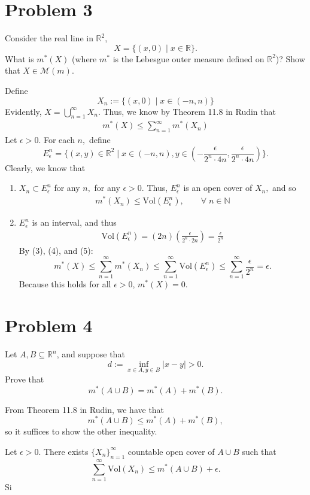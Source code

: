 \documentclass[11pt]{article}
\newcommand{\Vol}{\text{Vol}}
\newcommand{\bbN}{\mathbb{N}}
\newcommand{\bbR}{\mathbb{R}}
\begin{document}
\newpage
\section*{Problem 3}
\begin{problem}
    Consider the real line in $\mathbb{R}^2$, 
\[
X = \{(x,0) \mid x \in \mathbb{R}\}.
\]
What is $m^*(X)$ (where $m^*$ is the Lebesgue outer measure defined on $\mathbb{R}^2$)? Show that $X \in \mathcal{M}(m)$.
\end{problem}
\begin{solution}
Define 
\[X_n := \{(x,0) \mid x \in (-n, n)\}\]
Evidently, $X = \bigcup_{n=1}^\infty X_n.$ Thus, we know by Theorem 11.8 in Rudin that
\begin{align}
m^*(X) \leq \sum_{n=1}^\infty m^*(X_n)    
\end{align}
Let $\epsilon>0.$ For each $n,$ define 
\[E_\epsilon^n = \{(x,y) \in \bbR^2 \mid x \in (-n, n), y \in (-\frac{\epsilon}{2^n \cdot 4n}, \frac{\epsilon}{2^n \cdot 4n})\}.\] Clearly, we know that 
\begin{enumerate}
    \item $X_n \subset E_\epsilon^n$ for any $n,$ for any $\epsilon>0.$ Thus, $E_\epsilon^n$ is an open cover of $X_n,$ and so 
    \begin{align}
        m^*(X_n) \leq \Vol(E_\epsilon^n), \qquad \forall \;n \in \bbN
    \end{align}
    \item $E_\epsilon^n$ is an interval, and thus 
    \begin{align}\Vol(E_\epsilon^n) = (2n)(\frac{\epsilon}{2^n \cdot 2n}) = \frac{\epsilon}{2^n}    
    \end{align}
By (3), (4), and (5):
\[m^*(X) \leq \sum_{n=1}^\infty m^*(X_n)\leq \sum_{n=1}^\infty \Vol(E_\epsilon^n) \leq \sum_{n=1}^\infty \frac{\epsilon}{2^n} = \epsilon.\] Because this holds for all $\epsilon>0$, $m^*(X) = 0.$
\end{enumerate}
\end{solution}

\newpage
\section*{Problem 4}
\begin{problem}
    Let $A, B \subseteq \mathbb{R}^n$, and suppose that
\[
d := \inf_{x \in A, y \in B} |x - y| > 0.
\]
Prove that
\[
m^*(A \cup B) = m^*(A) + m^*(B).
\]
\end{problem}
\begin{solution}
    From Theorem 11.8 in Rudin, we have that 
    \[m^*(A \cup B) \leq m^*(A) + m^*(B),\] so it suffices to show the other inequality.

    Let $\epsilon>0.$ There exists $\{X_n\}_{n=1}^\infty$ countable open cover of $A\cup B$ such that
    \[\sum_{n=1}^\infty \Vol(X_n) \leq m^*(A \cup B) + \epsilon.\] Si
\end{solution}
\end{document}

